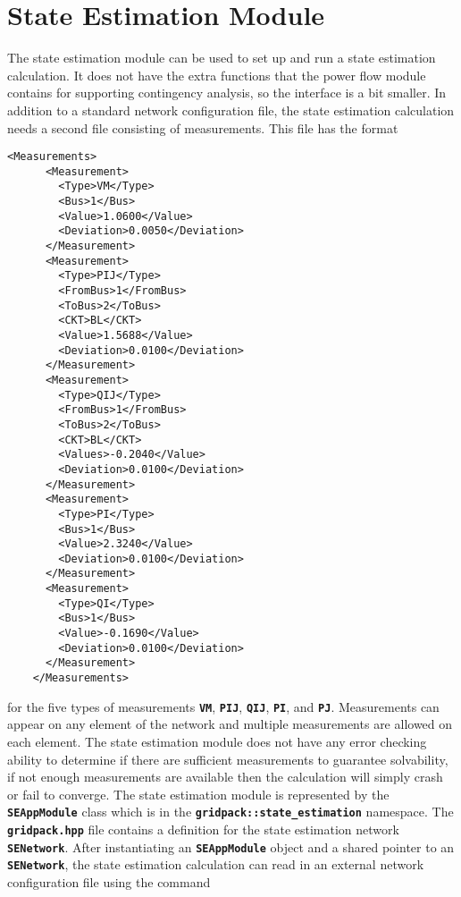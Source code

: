 \section{State Estimation Module}

The state estimation module can be used to set up and run a state estimation calculation. It does not have the extra functions that the power flow module contains for supporting contingency analysis, so the interface is a bit smaller. In addition to a standard network configuration file, the state estimation calculation needs a second file consisting of measurements. This file has the format

{
\color{blue}
\begin{Verbatim}[fontseries=b]
    <Measurements>
      <Measurement>
        <Type>VM</Type>
        <Bus>1</Bus>
        <Value>1.0600</Value>
        <Deviation>0.0050</Deviation>
      </Measurement>
      <Measurement>
        <Type>PIJ</Type>
        <FromBus>1</FromBus>
        <ToBus>2</ToBus>
        <CKT>BL</CKT>
        <Value>1.5688</Value>
        <Deviation>0.0100</Deviation>
      </Measurement>
      <Measurement>
        <Type>QIJ</Type>
        <FromBus>1</FromBus>
        <ToBus>2</ToBus>
        <CKT>BL</CKT>
        <Values>-0.2040</Value>
        <Deviation>0.0100</Deviation>
      </Measurement>
      <Measurement>
        <Type>PI</Type>
        <Bus>1</Bus>
        <Value>2.3240</Value>
        <Deviation>0.0100</Deviation>
      </Measurement>
      <Measurement>
        <Type>QI</Type>
        <Bus>1</Bus>
        <Value>-0.1690</Value>
        <Deviation>0.0100</Deviation>
      </Measurement>
    </Measurements>
\end{Verbatim}
}

for the five types of measurements \texttt{\textbf{VM}}, \texttt{\textbf{PIJ}}, \texttt{\textbf{QIJ}}, \texttt{\textbf{PI}}, and \texttt{\textbf{PJ}}. Measurements can appear on any element of the network and multiple measurements are allowed on each element. The state estimation module does not have any error checking ability to determine if there are sufficient measurements to guarantee solvability, if not enough measurements are available then the calculation will simply crash or fail to converge.
The state estimation module is represented by the \texttt{\textbf{SEAppModule}} class which is in the \texttt{\textbf{gridpack::state\_estimation}} namespace. The \texttt{\textbf{gridpack.hpp}} file contains a definition for the state estimation network \texttt{\textbf{SENetwork}}. After instantiating an \texttt{\textbf{SEAppModule}} object and a shared pointer to an \texttt{\textbf{SENetwork}}, the state estimation calculation can read in an external network configuration file using the command

